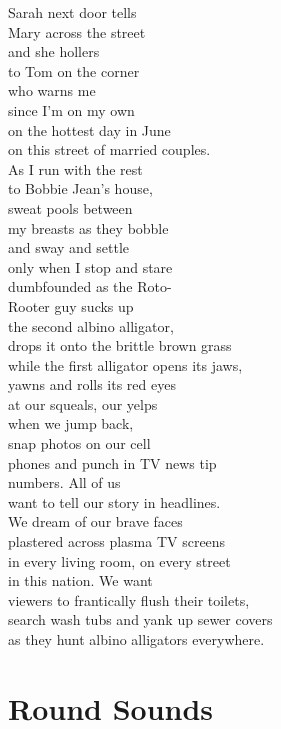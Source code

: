 \documentclass[twoside,10pt]{book}
\begin{document}
Sarah next door tells\\
Mary across the street\\
and she hollers\\
to Tom on the corner\\
who warns me\\
since I'm on my own\\
on the hottest day in June\\
on this street of married couples.\\
As I run with the rest\\
to Bobbie Jean's house,\\
sweat pools between\\
my breasts as they bobble\\
and sway and settle\\
only when I stop and stare\\
dumbfounded as the Roto-\\
Rooter guy sucks up\\
the second albino alligator,\\
drops it onto the brittle brown grass\\
while the first alligator opens its jaws,\\
yawns and rolls its red eyes\\
at our squeals, our yelps\\
when we jump back,\\
snap photos on our cell\\
phones and punch in TV news tip\\
numbers. All of us\\
want to tell our story in headlines.\\
We dream of our brave faces\\
plastered across plasma TV screens\\
in every living room, on every street\\
in this nation. We want\\
viewers to frantically flush their toilets,\\
search wash tubs and yank up sewer covers\\
as they hunt albino alligators everywhere.


\clearpage
\section{Round Sounds}
\end{document}

